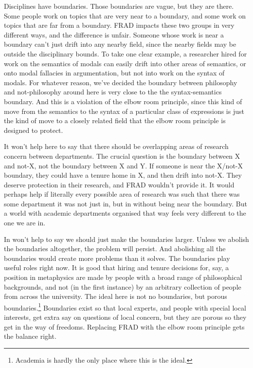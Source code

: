 \documentclass[
  11pt,
  letterpaper,
  DIV=11,
  numbers=noendperiod,
  twoside]{scrartcl}
\begin{document}
Disciplines have boundaries. Those boundaries are vague, but they are
there. Some people work on topics that are very near to a boundary, and
some work on topics that are far from a boundary. FRAD impacts these two
groups in very different ways, and the difference is unfair. Someone
whose work is near a boundary can't just drift into any nearby field,
since the nearby fields may be outside the disciplinary bounds. To take
one clear example, a researcher hired for work on the semantics of
modals can easily drift into other areas of semantics, or onto modal
fallacies in argumentation, but not into work on the syntax of modals.
For whatever reason, we've decided the boundary between philosophy and
not-philosophy around here is very close to the the syntax-semantics
boundary. And this is a violation of the elbow room principle, since
this kind of move from the semantics to the syntax of a particular class
of expressions is just the kind of move to a closely related field that
the elbow room principle is designed to protect.

It won't help here to say that there should be overlapping areas of
research concern between departments. The crucial question is the
boundary between X and not-X, not the boundary between X and Y. If
someone is near the X/not-X boundary, they could have a tenure home in
X, and then drift into not-X. They deserve protection in their research,
and FRAD wouldn't provide it. It would perhaps help if literally every
possible area of research was such that there was some department it was
not just in, but in without being near the boundary. But a world with
academic departments organised that way feels very different to the one
we are in.

In won't help to say we should just make the boundaries larger. Unless
we abolish the boundaries altogether, the problem will persist. And
abolishing all the boundaries would create more problems than it solves.
The boundaries play useful roles right now. It is good that hiring and
tenure decisions for, say, a position in metaphysics are made by people
with a broad range of philosophical backgrounds, and not (in the first
instance) by an arbitrary collection of people from across the
university. The ideal here is not no boundaries, but porous
boundaries.\footnote{Academia is hardly the only place where this is the
  ideal.} Boundaries exist so that local experts, and people with
special local interests, get extra say on questions of local concern,
but they are porous so they get in the way of freedoms. Replacing FRAD
with the elbow room principle gets the balance right.
\end{document}
